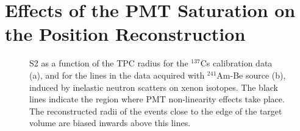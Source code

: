 \section{Effects of the PMT Saturation on the Position Reconstruction}
\label{secPosRecSaturation}

\begin{figure}[!h]
\centering
{}
\caption[S2 as a function of the TPC radius for the $^{137}$Cs calibration data, and for the $\gamma$-lines in the data acquired with $^{241}$Am-Be source]{S2 as a function of the TPC radius for the $^{137}$Cs calibration data (a), and for the lines in the data acquired with $^{241}$Am-Be source (b), induced by inelastic neutron scatters on xenon isotopes. The black lines indicate the region where PMT non-linearity effects take place. The reconstructed radii of the events close to the edge of the target volume are biased inwards above this lines.}
\label{figS2vsR}
\end{figure}

